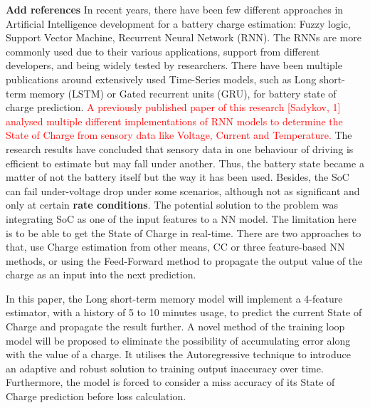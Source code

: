 %
%
\textbf{Add references}
In recent years, there have been few different approaches in Artificial Intelligence development for a battery charge estimation: Fuzzy logic, Support Vector Machine, Recurrent Neural Network (RNN).
The RNNs are more commonly used due to their various applications, support from different developers, and being widely tested by researchers.
There have been multiple publications around extensively used Time-Series models, such as Long short-term memory (LSTM) or Gated recurrent units (GRU), for battery state of charge prediction.
\textcolor{red}{A previously published paper of this research [Sadykov, 1] analysed multiple different implementations of RNN models to determine the State of Charge from sensory data like Voltage, Current and Temperature.}
The research results have concluded that sensory data in one behaviour of driving is efficient to estimate but may fall under another.
Thus, the battery state became a matter of not the battery itself but the way it has been used.
Besides, the SoC can fail under-voltage drop under some scenarios, although not as significant and only at certain \textbf{rate conditions}.
The potential solution to the problem was integrating SoC as one of the input features to a NN model.
The limitation here is to be able to get the State of Charge in real-time.
There are two approaches to that, use Charge estimation from other means, CC or three feature-based NN methods, or using the Feed-Forward method to propagate the output value of the charge as an input into the next prediction.

%
%
In this paper, the Long short-term memory model will implement a 4-feature estimator, with a history of 5 to 10 minutes usage, to predict the current State of Charge and propagate the result further.
A novel method of the training loop model will be proposed to eliminate the possibility of accumulating error along with the value of a charge.
It utilises the Autoregressive technique to introduce an adaptive and robust solution to training output inaccuracy over time.
Furthermore, the model is forced to consider a miss accuracy of its State of Charge prediction before loss calculation.

